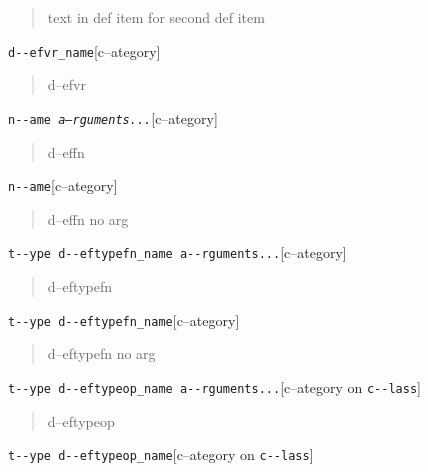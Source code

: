 \documentclass{book}
\begin{document}
%
\begin{quote}
text in def item for second def item
\end{quote}


\noindent\texttt{d{-}{-}efvr\_name}\hfill[c--ategory]



%
\begin{quote}
d--efvr
\end{quote}

\noindent\texttt{n{-}{-}ame \EmbracOn{}\textnormal{\textsl{a--rguments...}}\EmbracOff{}}\hfill[c--ategory]



%
\begin{quote}
d--effn
\end{quote}

\noindent\texttt{n{-}{-}ame}\hfill[c--ategory]



%
\begin{quote}
d--effn no arg
\end{quote}

\noindent\texttt{t{-}{-}ype d{-}{-}eftypefn\_name a{-}{-}rguments...}\hfill[c--ategory]



%
\begin{quote}
d--eftypefn
\end{quote}

\noindent\texttt{t{-}{-}ype d{-}{-}eftypefn\_name}\hfill[c--ategory]



%
\begin{quote}
d--eftypefn no arg
\end{quote}

\noindent\texttt{t{-}{-}ype d{-}{-}eftypeop\_name a{-}{-}rguments...}\hfill[c--ategory on \texttt{c{-}{-}lass}]



%
\begin{quote}
d--eftypeop
\end{quote}

\noindent\texttt{t{-}{-}ype d{-}{-}eftypeop\_name}\hfill[c--ategory on \texttt{c{-}{-}lass}]
\end{document}

